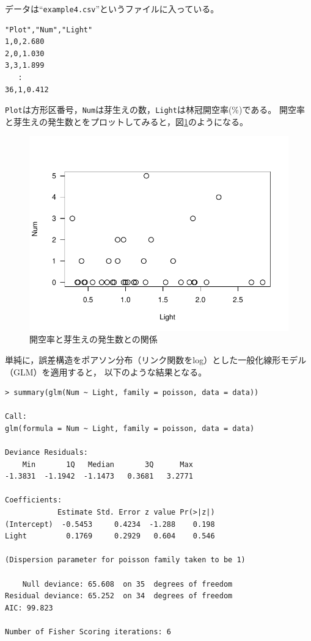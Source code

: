 \documentclass[11pt,uplatex]{jsarticle}
\begin{document}
データは``\texttt{example4.csv}''というファイルに入っている。
\begin{lstlisting}
"Plot","Num","Light"
1,0,2.680
2,0,1.030
3,3,1.899
   :
36,1,0.412
\end{lstlisting}
\noindent
\texttt{Plot}は方形区番号，\texttt{Num}は芽生えの数，\texttt{Light}は林冠開空率(\%)である。
開空率と芽生えの発生数とをプロットしてみると，図\ref{example4_scatter}のようになる。

\begin{figure}[hbtp]
  \begin{center}
    \includegraphics[bb=0 0 360 270, clip, width=300 bp]{example4_scatter.pdf}
  \end{center}
  \caption{開空率と芽生えの発生数との関係}
  \label{example4_scatter}
\end{figure}

単純に，誤差構造をポアソン分布（リンク関数をlog）とした一般化線形モデル（GLM）を適用すると，
以下のような結果となる。

\begin{lstlisting}
> summary(glm(Num ~ Light, family = poisson, data = data))

Call:
glm(formula = Num ~ Light, family = poisson, data = data)

Deviance Residuals: 
    Min       1Q   Median       3Q      Max  
-1.3831  -1.1942  -1.1473   0.3681   3.2771  

Coefficients:
            Estimate Std. Error z value Pr(>|z|)
(Intercept)  -0.5453     0.4234  -1.288    0.198
Light         0.1769     0.2929   0.604    0.546

(Dispersion parameter for poisson family taken to be 1)

    Null deviance: 65.608  on 35  degrees of freedom
Residual deviance: 65.252  on 34  degrees of freedom
AIC: 99.823

Number of Fisher Scoring iterations: 6
\end{lstlisting}
\end{document}
